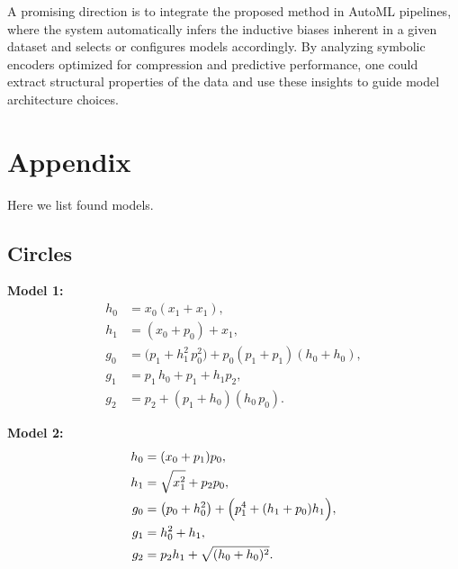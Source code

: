 \documentclass[14pt]{extarticle}
\begin{document}
    A promising direction is to integrate the proposed method in AutoML pipelines, where the system automatically infers the inductive biases inherent in a given dataset and selects or configures models accordingly. By analyzing symbolic encoders optimized for compression and predictive performance, one could extract structural properties of the data and use these insights to guide model architecture choices.
\newpage
% 
% 
{}



\newpage
\section{Appendix}\label{appendix}
    Here we list found models.
    \subsection{Circles}\label{appendix-circles}
    
    \textbf{Model 1:}
    \begin{align*}
    h_0 &= x_0(x_1 + x_1),\\
    h_1 &= (x_0 + p_0) + x_1,\\
    g_0 &= \bigl(p_1 + h_1^2\,p_0^2\bigr) + p_0(p_1 + p_1)(h_0 + h_0),\\
    g_1 &= p_1\,h_0 + p_1 + h_1p_2,\\
    g_2 &= p_2 + (p_1 + h_0)(h_0\,p_0).
    \end{align*}
    
    \textbf{Model 2:}
    \begin{align*}
    h_0 &= (x_0 + p_1)p_0,\\
    h_1 &= \sqrt{x_1^2} + p_2p_0,\\
    g_0 &= \bigl(p_0 + h_0^2\bigr) + \Bigl(p_1^4 + (h_1 + p_0)h_1\Bigr),\\
    g_1 &= h_0^2 + h_1,\\
    g_2 &= p_2h_1 + \sqrt{(h_0 + h_0)^2}.
    \end{align*}
    
\end{document}
